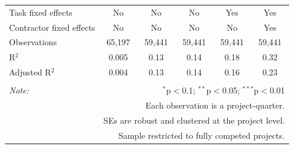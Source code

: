 \documentclass[
]{article}
\begin{document}
\begin{table}[H]
\begin{tabular}{@{\extracolsep{-2pt}}lccccc}
Task fixed effects & No & No & No & Yes & Yes \\ 
Contractor fixed effects & No & No & No & No & Yes \\ 
Observations & 65,197 & 59,441 & 59,441 & 59,441 & 59,441 \\ 
R$^{2}$ & 0.005 & 0.13 & 0.14 & 0.18 & 0.32 \\ 
Adjusted R$^{2}$ & 0.004 & 0.13 & 0.14 & 0.16 & 0.23 \\ 
\hline 
\hline \\[-1.8ex] 
\textit{Note:}  & \multicolumn{5}{r}{$^{*}$p$<$0.1; $^{**}$p$<$0.05; $^{***}$p$<$0.01} \\ 
 & \multicolumn{5}{r}{Each observation is a project-quarter.} \\ 
 & \multicolumn{5}{r}{SEs are robust and clustered at the project level.} \\ 
 & \multicolumn{5}{r}{Sample restricted to fully competed projects.} \\ 
\end{tabular} 
\end{table}
\end{document}
